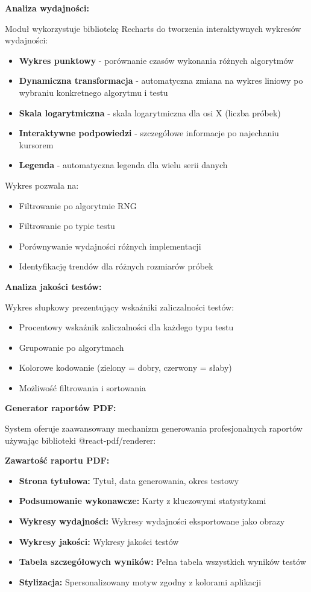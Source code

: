 \documentclass[12pt,a4paper]{article}
\begin{document}
\textbf{Analiza wydajności:}

Moduł wykorzystuje bibliotekę Recharts do tworzenia interaktywnych wykresów wydajności:
\begin{itemize}
    \item \textbf{Wykres punktowy} - porównanie czasów wykonania różnych algorytmów
    \item \textbf{Dynamiczna transformacja} - automatyczna zmiana na wykres liniowy po wybraniu konkretnego algorytmu i testu
    \item \textbf{Skala logarytmiczna} - skala logarytmiczna dla osi X (liczba próbek)
    \item \textbf{Interaktywne podpowiedzi} - szczegółowe informacje po najechaniu kursorem
    \item \textbf{Legenda} - automatyczna legenda dla wielu serii danych
\end{itemize}

Wykres pozwala na:
\begin{itemize}
    \item Filtrowanie po algorytmie RNG
    \item Filtrowanie po typie testu
    \item Porównywanie wydajności różnych implementacji
    \item Identyfikację trendów dla różnych rozmiarów próbek
\end{itemize}

\textbf{Analiza jakości testów:}

Wykres słupkowy prezentujący wskaźniki zaliczalności testów:
\begin{itemize}
    \item Procentowy wskaźnik zaliczalności dla każdego typu testu
    \item Grupowanie po algorytmach
    \item Kolorowe kodowanie (zielony = dobry, czerwony = słaby)
    \item Możliwość filtrowania i sortowania
\end{itemize}

\textbf{Generator raportów PDF:}

System oferuje zaawansowany mechanizm generowania profesjonalnych raportów używając biblioteki @react-pdf/renderer:

\textbf{Zawartość raportu PDF:}
\begin{itemize}
    \item \textbf{Strona tytułowa:} Tytuł, data generowania, okres testowy
    \item \textbf{Podsumowanie wykonawcze:} Karty z kluczowymi statystykami
    \item \textbf{Wykresy wydajności:} Wykresy wydajności eksportowane jako obrazy
    \item \textbf{Wykresy jakości:} Wykresy jakości testów
    \item \textbf{Tabela szczegółowych wyników:} Pełna tabela wszystkich wyników testów
    \item \textbf{Stylizacja:} Spersonalizowany motyw zgodny z kolorami aplikacji
\end{itemize}
\end{document}
